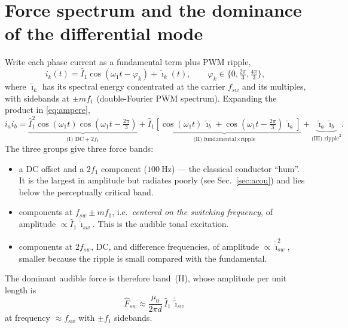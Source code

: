 \documentclass[11pt,a4paper]{article}
\begin{document}
\section{Force spectrum and the dominance of the differential mode}
Write each phase current as a fundamental term plus PWM ripple,
\begin{equation}
i_k(t)=\hat I_1\cos(\omega_1 t-\varphi_k)+\tilde\imath_k(t),
\qquad \varphi_k\in\{0,\tfrac{2\pi}{3},\tfrac{4\pi}{3}\},
\end{equation}
where $\tilde\imath_k$ has its spectral energy concentrated at the carrier
$f_{sw}$ and its multiples, with sidebands at $\pm m f_1$ (double-Fourier PWM
spectrum). Expanding the product in \eqref{eq:ampere},
\begin{equation}
i_a i_b=
\underbrace{\hat I_1^2\cos(\omega_1 t)\cos(\omega_1 t-\tfrac{2\pi}{3})}_{\text{(I) DC}+2f_1}
+\underbrace{\hat I_1\!\left[\cos(\omega_1 t)\,\tilde\imath_b+\cos(\omega_1 t-\tfrac{2\pi}{3})\,\tilde\imath_a\right]}_{\text{(II) fundamental}\times\text{ripple}}
+\underbrace{\tilde\imath_a\tilde\imath_b}_{\text{(III) ripple}^2}.
\label{eq:expand}
\end{equation}
The three groups give three force bands:
\begin{itemize}[leftmargin=*,nosep]
\item[(I)] a DC offset and a $2f_1$ component ($100\ \mathrm{Hz}$) --- the
classical conductor ``hum''. It is the largest in amplitude but radiates poorly
(see Sec.~\ref{sec:acou}) and lies below the perceptually critical band.
\item[(II)] components at $f_{sw}\pm m f_1$, i.e.\ \emph{centered on the switching
frequency}, of amplitude $\propto \hat I_1\,\hat{\tilde\imath}_{sw}$. This is the
audible tonal excitation.
\item[(III)] components at $2f_{sw}$, DC, and difference frequencies, of amplitude
$\propto \hat{\tilde\imath}_{sw}^2$, smaller because the ripple is small compared
with the fundamental.
\end{itemize}
The dominant audible force is therefore band~(II), whose amplitude per unit length
is
\begin{equation}
\boxed{\;\hat F_{sw}\approx\frac{\mu_0}{2\pi d}\,\hat I_1\,\hat{\tilde\imath}_{sw}\;}
\label{eq:Fsw}
\end{equation}
at frequency $\approx f_{sw}$ with $\pm f_1$ sidebands.
\end{document}
